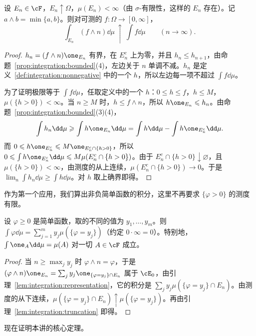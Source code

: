 \begin{lemma}\label{lem:integration:truncation}
设 $E_n\in\cF$，$E_n\uparrow\Omega$，$\mu(E_n)<\infty$（由 $\sigma$-有限性，这样的 $E_n$ 存在）。记 $a\wedge b=\min\{a,b\}$。则对可测的 $f:\Omega\to[0,\infty]$，
\[
\int_{E_n}(f\wedge n)\dd\mu\ \uparrow\ \int f\dd\mu\qquad(n\to\infty).
\]
\end{lemma}
\begin{proof}
$h_n=(f\wedge n)\one_{E_n}$ 有界，在 $E_n^c$ 上为零，并且 $h_n\leqslant h_{n+1}$，由命题~\ref{prop:integration:bounded}(4)，左边关于 $n$ 单调不减。$h_n$ 是定义~\ref{def:integration:nonnegative} 中的一个 $h$，所以左边每一项不超过 $\int f\dd\mu$。

为了证明极限等于 $\int f\dd\mu$，任取定义中的一个 $h$：$0\leqslant h\leqslant f$，$h\leqslant M$，$\mu(\{h>0\})<\infty$。当 $n\geqslant M$ 时，$h\leqslant f\wedge n$，所以 $h\one_{E_n}\leqslant h_n$。由命题~\ref{prop:integration:bounded}(3)(4)，
\[
\int h_n\dd\mu\geqslant\int h\one_{E_n}\dd\mu=\int h\dd\mu-\int h\one_{E_n^c}\dd\mu .
\]
而 $0\leqslant h\one_{E_n^c}\leqslant M\one_{E_n^c\cap\{h>0\}}$，所以 $0\leqslant\int h\one_{E_n^c}\dd\mu\leqslant M\mu(E_n^c\cap\{h>0\})$。由于 $E_n^c\cap\{h>0\}\downarrow\varnothing$，且 $\mu(\{h>0\})<\infty$，由测度的从上连续，$\mu(E_n^c\cap\{h>0\})\to0$。于是 $\lim_n\int h_n\dd\mu\geqslant\int h\dd\mu$。对 $h$ 取上确界即得。
\end{proof}

作为第一个应用，我们算出非负简单函数的积分，这里不再要求 $\{\varphi>0\}$ 的测度有限。

\begin{corollary}\label{cor:integration:nonnegative-simple}
设 $\varphi\geqslant0$ 是简单函数，取的不同的值为 $y_1,\dots,y_m$。则 $\int\varphi\dd\mu=\sum_{j=1}^my_j\mu(\{\varphi=y_j\})$（约定 $0\cdot\infty=0$）。特别地，$\int\one_A\dd\mu=\mu(A)$ 对一切 $A\in\cF$ 成立。
\end{corollary}
\begin{proof}
当 $n\geqslant\max_jy_j$ 时 $\varphi\wedge n=\varphi$，于是 $(\varphi\wedge n)\one_{E_n}=\sum_jy_j\one_{\{\varphi=y_j\}\cap E_n}$ 属于 $\cE_0$，由引理~\ref{lem:integration:representation}，它的积分是 $\sum_jy_j\mu(\{\varphi=y_j\}\cap E_n)$。由测度的从下连续，$\mu(\{\varphi=y_j\}\cap E_n)\uparrow\mu(\{\varphi=y_j\})$。再由引理~\ref{lem:integration:truncation} 即得。
\end{proof}


现在证明本讲的核心定理。

